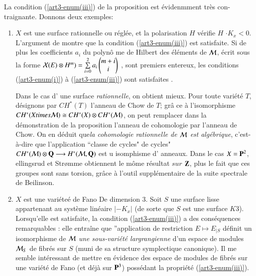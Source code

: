 \begin{remarque*}
La condition (\ref{art3-enum(iii)}) de la proposition est \'evidenmment tr\`es con-traignante. Donnons deux exemples:

\begin{enumerate}[{\rm a)}]
\item $X$ est une surface rationnelle ou r\'egl\'ee, et la polarisation $H$ v\'erifie $H$ $\cdot K_{x}<0$. L'argument de \cite[cor. 6.7.3]{art3-keyM} montre que la condition (\ref{art3-enum(iii)}) est satisfaite. Si de plus les coefficients $a_{i}$ du polyn\^o me de Hilbert des \'el\'ements de $\mathcal{M}$, \'ecrit sous la forme\label{art3-enmu(a))}
$
\mathcal{X}(E)\otimes H^{m}) = \sum\limits_{i=0}^{2}a_{i}
\begin{pmatrix}
m+i\\
i
\end{pmatrix}
$
, sont premiers entereux, les conditions (\ref{art3-enum(i)}) \`a (\ref{art3-enum(iii)}) sont satisfaites \cite[$\calx$6]{art3-keyM}.

Dans le cas d' une surface \textit{rationnelle}, on obtient mieux. Pour toute vari\'et\'e $T$, d\'esignons par $C H^{*}(T)$ l'anneau de Chow de $T$; gr\^a ce \`a l'isomorphisme $C H^{*}(X times \mathcal{M}) \cong C H ^{*}(X) \otimes C H^{*}(\mathcal{M})$, on peut remplacer dans la d\'emonstration de la proposition l'anneau de cohomologie par l'anneau de Chow. On en d\'eduit que\textit{la cohomologie rationnelle de $\mathcal{M}$ est alg\'ebrique}, c'est-\`a-dire que l'application ``classe de cycles" de cycles" $C H^{*}(\mathcal{M}) \otimes \mathbf{Q} \longrightarrow H^{*}(\cal M , \mathbf{Q})$ est u isomphisme d' anneaux. Dans le cas $X= \mathbf{P}^{2}$, ellingsrud et Str\o mme obtiennent le m\^ome r\'esultat $sur$ $\mathbf{Z}$, plus le fait que ces groupes sont sans torsion, gr\^ace \`a l'outil suppl\'ementaire de la suite spectrale de Beilinson. 

\item $X$ est une vari\'ete\'e de Fano De dimension 3. Soit $S$ une surface lisse appartenant au syst\`eme lin\'eaire $|-K_{x}|$ (de sorte que $S$ est une surface $K3$). Lorsqu'elle est satisfaite, la condition (\ref{art3-enum(iii)}) a des cons\'equences remarquables \cite{art3-keyT}: elle entra\^ine que ''application de restriction $E \longmapsto E_{|S}$ d\'efinit un isomorphisme de $\mathcal{M}$ \textit{une sous-vari\'et\'e largrangienne} d'un espace de modules $\mathcal{M}_{S}$ de fibr\'es sur $S$ (muni de sa structure symplectique canonique). Il me semble int\'eressant de mettre en \'evidence des espace de modules de fibr\'es sur une vari\'et\'e de Fano (et d\'ej\`a sur $\mathbf{P}^{3}$) poss\'edant la propri\'et\'e (\ref{art3-enum(iii)}). \label{art3-enmu(b))} 
\end{enumerate}
\end{remarque*}

